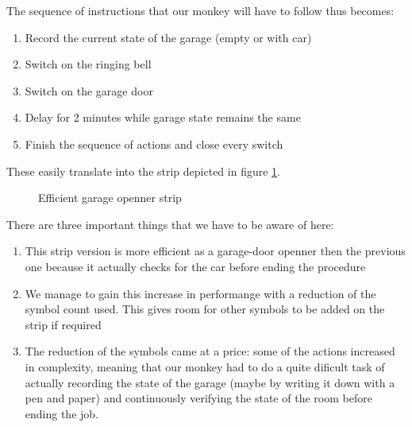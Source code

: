 \documentclass[12pt, a4paper]{book}
\begin{document}
The sequence of instructions that our monkey will have to follow thus becomes:
\begin{enumerate}
 \item Record the current state of the garage (empty or with car)
 \item Switch on the ringing bell
 \item Switch on the garage door
 \item Delay for 2 minutes while garage state remains the same
 \item Finish the sequence of actions and close every switch
\end{enumerate}

These easily translate into the strip depicted in figure \ref{fig:monkey efficient garage door openner}. 

\begin{figure}[h]
  \centering
  \caption{Efficient garage openner strip}  
  \label{fig:monkey efficient garage door openner}
\end{figure}

There are three important things that we have to be aware of here:
\begin{enumerate}
  \item This strip version is more efficient as a garage-door openner then the previous one because it actually checks for the car before ending the procedure
  \item We manage to gain this increase in performange with a reduction of the symbol count used. This gives room for other symbols to be added on the strip if required
  \item The reduction of the symbols came at a price: some of the actions increased in complexity, meaning that our monkey had to do a quite dificult task of actually recording the state of the garage (maybe by writing it down with a pen and paper) and continuously verifying the state of the room before ending the job. 
\end{enumerate} 
\end{document}
